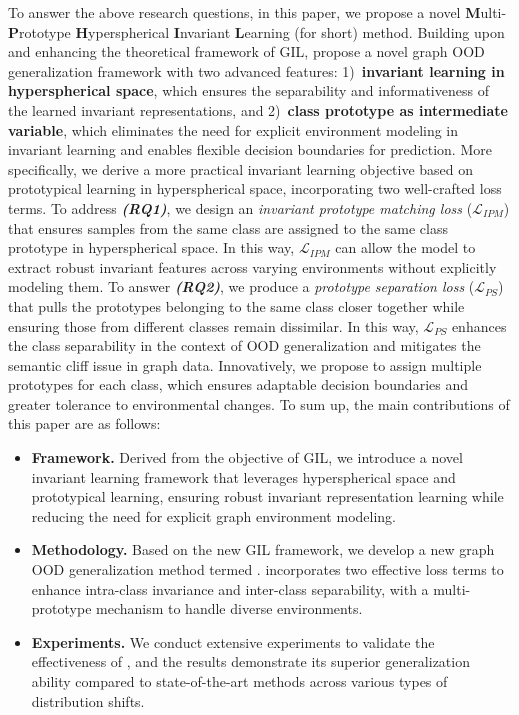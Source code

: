 To answer the above research questions, in this paper, we propose a novel \textbf{M}ulti-\textbf{P}rototype \textbf{H}yperspherical \textbf{I}nvariant \textbf{L}earning (\ourmethod for short) method. Building upon and enhancing the theoretical framework of GIL, \ourmethod propose a novel graph OOD generalization framework with two advanced features: 1)~\textbf{invariant learning in hyperspherical space}, which ensures the separability and informativeness of the learned invariant representations, and 2)~\textbf{class prototype as intermediate variable}, which eliminates the need for explicit environment modeling in invariant learning and enables flexible decision boundaries for prediction. 
More specifically, we derive a more practical invariant learning objective based on prototypical learning in hyperspherical space, incorporating two well-crafted loss terms. To address \textbf{\textit{(RQ1)}}, we design an \textit{invariant prototype matching loss} ($\mathcal{L}_{IPM}$) that ensures samples from the same class are assigned to the same class prototype in hyperspherical space. In this way, $\mathcal{L}_{IPM}$ can allow the model to extract robust invariant features across varying environments without explicitly modeling them. To answer \textbf{\textit{(RQ2)}}, we produce a \textit{prototype separation loss} ($\mathcal{L}_{PS}$) that pulls the prototypes belonging to the same class closer together while ensuring those from different classes remain dissimilar. In this way, $\mathcal{L}_{PS}$ enhances the class separability in the context of OOD generalization and mitigates the semantic cliff issue in graph data. Innovatively, we propose to assign multiple prototypes for each class, which ensures adaptable decision boundaries and greater tolerance to environmental changes. To sum up, the main contributions of this paper are as follows:

\begin{itemize}[leftmargin=*]
    \item \textbf{Framework.} Derived from the objective of GIL, we introduce a novel invariant learning framework that leverages hyperspherical space and prototypical learning, ensuring robust invariant representation learning while reducing the need for explicit graph environment modeling. 
    
    \item \textbf{Methodology.} Based on the new GIL framework, we develop a new graph OOD generalization method termed \ourmethod. \ourmethod incorporates two effective loss terms to enhance intra-class invariance and inter-class separability, with a multi-prototype mechanism to handle diverse environments.
    
    \item \textbf{Experiments.}  We conduct extensive experiments to validate the effectiveness of \ourmethod, and the results demonstrate its superior generalization ability compared to state-of-the-art methods across various types of distribution shifts.
\end{itemize}

